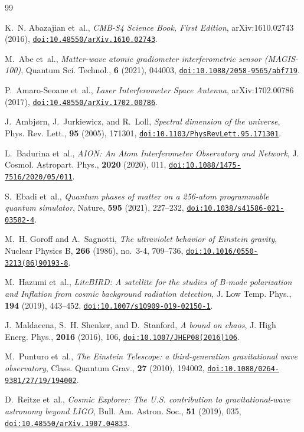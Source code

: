 \documentclass[aps,prl,reprint,twocolumn,superscriptaddress,nofootinbib,floatfix]{revtex4-2}
\providecommand{\doi}[1]{\href{https://doi.org/#1}{\nolinkurl{doi:#1}}}
\begin{document}
\begin{thebibliography}{99}

K.~N. Abazajian et~al.,
\emph{CMB-S4 Science Book, First Edition},
arXiv:1610.02743 (2016),
\doi{10.48550/arXiv.1610.02743}.

M.~Abe et~al.,
\emph{Matter-wave atomic gradiometer interferometric sensor (MAGIS-100)},
Quantum Sci. Technol., \textbf{6} (2021), 044003,
\doi{10.1088/2058-9565/abf719}.

P.~Amaro-Seoane et~al.,
\emph{Laser Interferometer Space Antenna},
arXiv:1702.00786 (2017),
\doi{10.48550/arXiv.1702.00786}.

J.~Ambj{\o}rn, J.~Jurkiewicz, and R.~Loll,
\emph{Spectral dimension of the universe},
Phys. Rev. Lett., \textbf{95} (2005), 171301,
\doi{10.1103/PhysRevLett.95.171301}.

L.~Badurina et~al.,
\emph{AION: An Atom Interferometer Observatory and Network},
J. Cosmol. Astropart. Phys., \textbf{2020} (2020), 011,
\doi{10.1088/1475-7516/2020/05/011}.

S.~Ebadi et~al.,
\emph{Quantum phases of matter on a 256-atom programmable quantum simulator},
Nature, \textbf{595} (2021), 227--232,
\doi{10.1038/s41586-021-03582-4}.

M.~H. Goroff and A.~Sagnotti,
\emph{The ultraviolet behavior of Einstein gravity},
Nuclear Physics B, \textbf{266} (1986), no.~3-4, 709--736,
\doi{10.1016/0550-3213(86)90193-8}.

M.~Hazumi et~al.,
\emph{LiteBIRD: A satellite for the studies of B-mode polarization and Inflation from cosmic background radiation detection},
J. Low Temp. Phys., \textbf{194} (2019), 443--452,
\doi{10.1007/s10909-019-02150-1}.

J.~Maldacena, S.~H. Shenker, and D.~Stanford,
\emph{A bound on chaos},
J. High Energ. Phys., \textbf{2016} (2016), 106,
\doi{10.1007/JHEP08(2016)106}.

M.~Punturo et~al.,
\emph{The Einstein Telescope: a third-generation gravitational wave observatory},
Class. Quantum Grav., \textbf{27} (2010), 194002,
\doi{10.1088/0264-9381/27/19/194002}.

D.~Reitze et~al.,
\emph{Cosmic Explorer: The U.S. contribution to gravitational-wave astronomy beyond LIGO},
Bull. Am. Astron. Soc., \textbf{51} (2019), 035,
\doi{10.48550/arXiv.1907.04833}.


\end{thebibliography}
\end{document}
